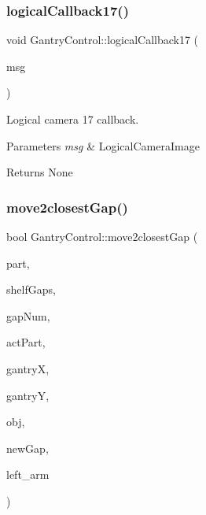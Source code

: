 \subsubsection{\texorpdfstring{logical\+Callback17()}{logicalCallback17()}}
{\footnotesize\ttfamily void Gantry\+Control\+::logical\+Callback17 (\begin{DoxyParamCaption}\item[{const nist\+\_\+gear\+::\+Logical\+Camera\+Image \&}]{msg }\end{DoxyParamCaption})}



Logical camera 17 callback. 


\begin{DoxyParams}{Parameters}
{\em msg} & Logical\+Camera\+Image \\
\hline
\end{DoxyParams}
\begin{DoxyReturn}{Returns}
None 
\end{DoxyReturn}
\mbox{\label{classGantryControl_a7254dcd957785ee836d611581d3eda46}} 
\subsubsection{\texorpdfstring{move2closest\+Gap()}{move2closestGap()}}
{\footnotesize\ttfamily bool Gantry\+Control\+::move2closest\+Gap (\begin{DoxyParamCaption}\item[{struct \hyperlink{structPart}{Part} \&}]{part,  }\item[{std\+::vector$<$ std\+::pair$<$ float, float $>$ $>$ \&}]{shelf\+Gaps,  }\item[{const std\+::vector$<$ int $>$ \&}]{gap\+Num,  }\item[{bool}]{act\+Part,  }\item[{float \&}]{gantryX,  }\item[{float \&}]{gantryY,  }\item[{\hyperlink{classObstaclesInAisle}{Obstacles\+In\+Aisle} \&}]{obj,  }\item[{int \&}]{new\+Gap,  }\item[{std\+::vector$<$ double $>$ \&}]{left\+\_\+arm }\end{DoxyParamCaption})}



